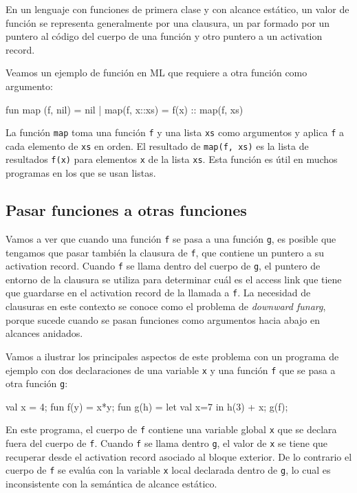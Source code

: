 \documentclass[10pt,a4paper]{report}
\begin{document}
En un lenguaje con funciones de primera clase y con alcance estático,
un valor de función se representa generalmente por una clausura,
un par formado por un puntero al código del cuerpo de una función y
otro puntero a un activation record.

Veamos un ejemplo de función en ML que requiere a otra función como argumento:

\begin{table}
 fun map (f, nil) = nil 
| map(f, x::xs) = f(x) :: map(f, xs)
\end{table}


La función \verb|map| toma una función \verb|f| y una lista \verb|xs|
como argumentos y aplica \verb|f| a cada elemento de \verb|xs| en
orden. El resultado de \verb|map(f, xs)| es la lista de resultados
\verb|f(x)| para elementos \verb|x| de la lista \verb|xs|. Esta función
es útil en muchos programas en los que se usan listas.

\subsection{Pasar funciones a otras funciones}

Vamos a ver que cuando una función \verb|f| se pasa a una función
\verb|g|, es posible que tengamos que pasar también la clausura de
\verb|f|, que contiene un puntero a su activation record. Cuando
\verb|f| se llama dentro del cuerpo de \verb|g|, el puntero de entorno
de la clausura se utiliza para determinar cuál es el access link que
tiene que guardarse en el activation record de la llamada a
\verb|f|. La necesidad de clausuras en este contexto se conoce como el
problema de \textit{downward funarg}, porque sucede cuando se pasan
funciones como argumentos hacia abajo en alcances anidados.

Vamos a ilustrar los principales aspectos de este problema con un 
programa de ejemplo con dos declaraciones de una variable \verb|x| y una función \verb|f| que se pasa a otra función \verb|g|:

val x = 4; 
fun f(y) = x*y; 
fun g(h) = let val x=7 in h(3) + x; 
g(f);

En este programa, el cuerpo de \verb|f| contiene una variable global
\verb|x| que se declara fuera del cuerpo de \verb|f|. Cuando \verb|f|
se llama dentro \verb|g|, el valor de \verb|x| se tiene que recuperar
desde el activation record asociado al bloque exterior. De lo
contrario el cuerpo de \verb|f| se evalúa con la variable \verb|x|
local declarada dentro de \verb|g|, lo cual es inconsistente con la
semántica de alcance estático.
\end{document}
